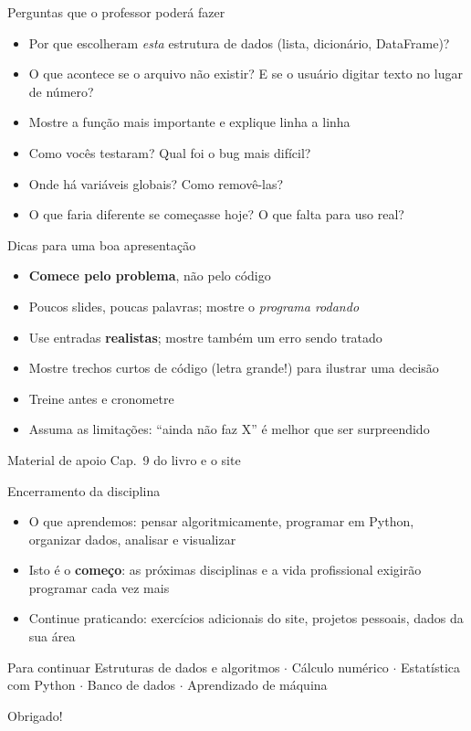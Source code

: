 \documentclass[aspectratio=169,10pt,t]{beamer}
\begin{document}
\begin{frame}{Perguntas que o professor poderá fazer}
  \begin{itemize}
    \item Por que escolheram \emph{esta} estrutura de dados (lista, dicionário, DataFrame)?
    \item O que acontece se o arquivo não existir? E se o usuário digitar texto no lugar de número?
    \item Mostre a função mais importante e explique linha a linha
    \item Como vocês testaram? Qual foi o bug mais difícil?
    \item Onde há variáveis globais? Como removê-las?
    \item O que faria diferente se começasse hoje? O que falta para uso real?
  \end{itemize}
\end{frame}

\begin{frame}{Dicas para uma boa apresentação}
  \begin{itemize}
    \item \textbf{Comece pelo problema}, não pelo código
    \item Poucos slides, poucas palavras; mostre o \emph{programa rodando}
    \item Use entradas \textbf{realistas}; mostre também um erro sendo tratado
    \item Mostre trechos curtos de código (letra grande!) para ilustrar uma decisão
    \item Treine antes e cronometre
    \item Assuma as limitações: ``ainda não faz X'' é melhor que ser surpreendido
  \end{itemize}
  \begin{exampleblock}{Material de apoio}
    Cap.~9 do livro e o site \href{\siteurl}{\texttt{\siteurl}}
  \end{exampleblock}
\end{frame}

\begin{frame}{Encerramento da disciplina}
  \begin{itemize}
    \item O que aprendemos: pensar algoritmicamente, programar em Python, organizar dados, analisar e visualizar
    \item Isto é o \textbf{começo}: as próximas disciplinas e a vida profissional exigirão programar cada vez mais
    \item Continue praticando: exercícios adicionais do site, projetos pessoais, dados da sua área
  \end{itemize}
  \vspace{1ex}
  \begin{block}{Para continuar}
    Estruturas de dados e algoritmos \(\cdot\) Cálculo numérico \(\cdot\) Estatística com Python \(\cdot\) Banco de dados \(\cdot\) Aprendizado de máquina
  \end{block}
  \vspace{1ex}
  \centering\large Obrigado!
\end{frame}
\end{document}
